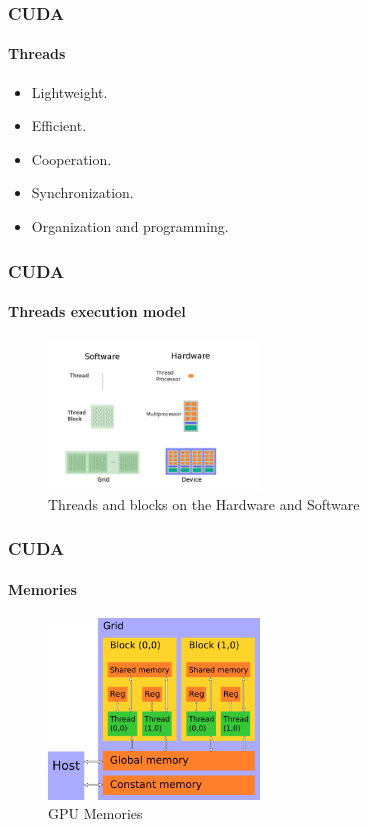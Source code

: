 \begin{frame}
    \frametitle{CUDA}
    \framesubtitle{Threads}
    \begin{itemize}
        \item Lightweight.
        \item Efficient.
        \item Cooperation.
        \item Synchronization.
        \item Organization and programming.
    \end{itemize}
\end{frame}

\begin{frame}
    \frametitle{CUDA}
    \framesubtitle{Threads execution model}
    \begin{figure}
        \centering
        \label{fig:cuda-threads}
        \includegraphics[width=0.5\textwidth]{img/cuda-threads}
        \caption{Threads and blocks on the Hardware and Software}
    \end{figure}
\end{frame}

\begin{frame}
    \frametitle{CUDA}
    \framesubtitle{Memories}
    \begin{figure}
        \centering
        \label{fig:cuda-memories}
        \includegraphics[width=0.5\textwidth]{img/cuda-memories}
        \caption{GPU Memories}
    \end{figure}
\end{frame}

